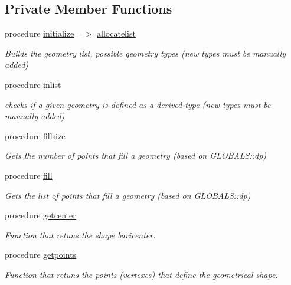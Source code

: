 \subsection*{Private Member Functions}
\begin{DoxyCompactItemize}
\item 
procedure \mbox{\hyperlink{structgeometry__mod_1_1geometry__class_a97a9a90ff4143d41fe57eb0e6d1c76a1}{initialize}} =$>$ \mbox{\hyperlink{namespacegeometry__mod_a1b6f259b0b6be71e02ffae7670f7d8ba}{allocatelist}}
\begin{DoxyCompactList}\small\item\em Builds the geometry list, possible geometry types (new types must be manually added) \end{DoxyCompactList}\item 
procedure \mbox{\hyperlink{structgeometry__mod_1_1geometry__class_a6dfcc19f822da875bebc58c3bf26e999}{inlist}}
\begin{DoxyCompactList}\small\item\em checks if a given geometry is defined as a derived type (new types must be manually added) \end{DoxyCompactList}\item 
procedure \mbox{\hyperlink{structgeometry__mod_1_1geometry__class_a75f5a37d0b38c8baf66ee5089ea44d7a}{fillsize}}
\begin{DoxyCompactList}\small\item\em Gets the number of points that fill a geometry (based on G\+L\+O\+B\+A\+L\+S\+::dp) \end{DoxyCompactList}\item 
procedure \mbox{\hyperlink{structgeometry__mod_1_1geometry__class_a0afee5607f0e2443a862741e40794368}{fill}}
\begin{DoxyCompactList}\small\item\em Gets the list of points that fill a geometry (based on G\+L\+O\+B\+A\+L\+S\+::dp) \end{DoxyCompactList}\item 
procedure \mbox{\hyperlink{structgeometry__mod_1_1geometry__class_a691891378a677185f2f13e736f68ff11}{getcenter}}
\begin{DoxyCompactList}\small\item\em Function that retuns the shape baricenter. \end{DoxyCompactList}\item 
procedure \mbox{\hyperlink{structgeometry__mod_1_1geometry__class_a4dd64d46f41c5c429a0b2b88250fa04e}{getpoints}}
\begin{DoxyCompactList}\small\item\em Function that retuns the points (vertexes) that define the geometrical shape. \end{DoxyCompactList}\item 

\end{DoxyCompactItemize}
